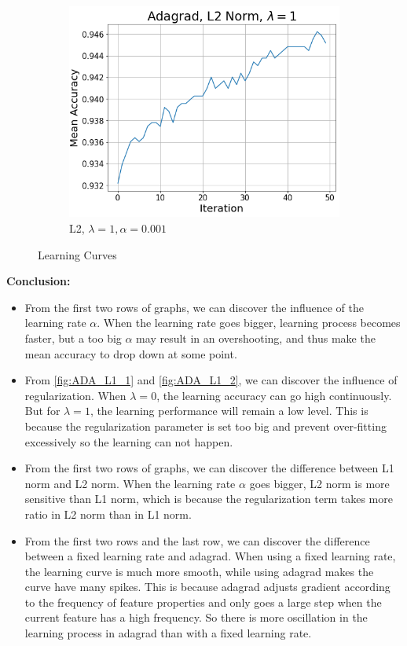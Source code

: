 \documentclass{article}
\begin{document}
\begin{enumerate}
\begin{figure}[h!]
     	\hfill
     	\begin{subfigure}[b]{0.3\textwidth}
         	\centering
         	\includegraphics[width=\textwidth]
         	{Problem_2_3/Adagrad_L2_1.png}
         	\caption{L2, $\lambda=1,\alpha=0.001$}
         	\label{fig:ADA_L2_1}
     	\end{subfigure}
     	\caption{Learning Curves}
		\end{figure}
		\noindent
		\textbf{Conclusion:}
		\begin{itemize}
     		\item From the first two rows of graphs, we can  discover the influence of the learning rate $\alpha$. When the learning rate goes bigger, learning process becomes faster, but a too big $\alpha$ may result in an overshooting, and thus make the mean accuracy to drop down at some point.
     		\item From \ref{fig:ADA_L1_1} and \ref{fig:ADA_L1_2}, we can discover the influence of regularization. When $\lambda=0$, the learning accuracy can go high continuously. But for $\lambda=1$, the learning performance will remain a low level. This is because the regularization parameter is set too big and prevent over-fitting excessively so the learning can not happen.
     		\item From the first two rows of graphs, we can discover the difference between L1 norm and L2 norm. When the learning rate $\alpha$ goes bigger, L2 norm is more sensitive than L1 norm, which is because the regularization term takes more ratio in L2 norm than in L1 norm.
     		\item From the first two rows and the last row, we can discover the difference between a fixed learning rate and adagrad. When using a fixed learning rate, the learning curve is much more smooth, while using adagrad makes the curve have many spikes. This is because adagrad adjusts gradient according to the frequency of feature properties and only goes a large step when the current feature has a high frequency. So there is more oscillation in the learning process in adagrad than with a fixed learning rate.
  		\end{itemize}		
    	\end{enumerate}
       
        
\end{document}
